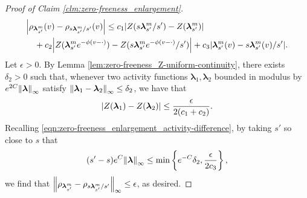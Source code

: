 \documentclass[11pt]{article}
\newcommand{\bl}{\bm{\lambda}}
\newcommand{\lsconst}{C}
\newcommand{\set}[1]{\left\{#1\right\}}
\numberwithin{equation}{section}
\theoremstyle{plain}
\theoremstyle{definition}
\theoremstyle{remark}
\begin{document}
\begin{proof}[Proof of Claim \ref{clm:zero-freeness_enlargement}]
\begin{equation}
\begin{multlined}
\abs{\rho_{\bl_{s'}^{m}}(v)-\rho_{s\bl_{s'}^{m}/s'}(v)}
\le c_{1}\abs{Z(s\bl_{s'}^{m}/s')-Z(\bl_{s'}^{m})}
\\
+c_{2}\abs{Z(\bl_{s'}^{m}e^{-\phi(v-\cdot)})-Z(s\bl_{s'}^{m}e^{-\phi(v-\cdot)}/s')}
+c_{3}\abs{\bl_{s'}^{m}(v)-s\bl_{s'}^{m}(v)/s'}.
\end{multlined}
\end{equation}
Let $\epsilon>0$.
By Lemma \ref{lem:zero-freeness_Z-uniform-continuity}, there exists $\delta_{2}>0$ such that, whenever two activity functions $\bl_{1},\bl_{2}$ bounded in modulus by $e^{2\lsconst}\norm{\bl}_{\infty}$ satisfy $\norm{\bl_{1}-\bl_{2}}_{\infty}\le\delta_{2}$, we have that 
\begin{equation}
\abs{Z(\bl_{1})-Z(\bl_{2})}\le\frac{\epsilon}{2(c_{1}+c_{2})}.
\end{equation}
Recalling \eqref{eqn:zero-freeness_enlargement_activity-difference}, by taking $s'$ so close to $s$ that
\begin{equation}
(s'-s)e^{\lsconst}\norm{\bl}_{\infty}\le\min\set{e^{-\lsconst}\delta_{2},\frac{\epsilon}{2c_{3}}},
\end{equation}
we find that $\norm{\rho_{\bl_{s'}^{m}}-\rho_{s\bl_{s'}^{m}/s'}}_{\infty}\le\epsilon$, as desired.
\end{proof}
\end{document}
